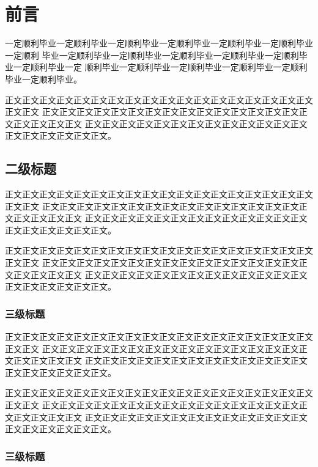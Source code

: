 \documentclass{hbutthesis}
\begin{document}
\pagestyle{fancy}
\newpage
{} %
\setcounter{page}{1} %
\chapter{前\hspace{1em}言}

\songti
一定顺利毕业一定顺利毕业一定顺利毕业一定顺利毕业一定顺利毕业一定顺利毕业一定顺利
毕业一定顺利毕业一定顺利毕业一定顺利毕业一定顺利毕业一定顺利毕业一定顺利毕业一定
顺利毕业一定顺利毕业一定顺利毕业一定顺利毕业一定顺利毕业一定顺利毕业。

正文正文正文正文正文正文正文正文正文正文正文正文正文正文正文正文正文正文正文正文
正文正文正文正文正文正文正文正文正文正文正文正文正文正文正文正文正文正文正文正文
正文正文正文正文正文正文正文正文正文正文正文正文正文正文正文正文正文正文正文。

\section{二级标题}

正文正文正文正文正文正文正文正文正文正文正文正文正文正文正文正文正文正文正文正文
正文正文正文正文正文正文正文正文正文正文正文正文正文正文正文正文正文正文正文正文
正文正文正文正文正文正文正文正文正文正文正文正文正文正文正文正文正文正文正文。

正文正文正文正文正文正文正文正文正文正文正文正文正文正文正文正文正文正文正文正文
正文正文正文正文正文正文正文正文正文正文正文正文正文正文正文正文正文正文正文正文
正文正文正文正文正文正文正文正文正文正文正文正文正文正文正文正文正文正文正文。

\subsection{三级标题}

正文正文正文正文正文正文正文正文正文正文正文正文正文正文正文正文正文正文正文正文
正文正文正文正文正文正文正文正文正文正文正文正文正文正文正文正文正文正文正文正文
正文正文正文正文正文正文正文正文正文正文正文正文正文正文正文正文正文正文正文。

正文正文正文正文正文正文正文正文正文正文正文正文正文正文正文正文正文正文正文正文
正文正文正文正文正文正文正文正文正文正文正文正文正文正文正文正文正文正文正文正文
正文正文正文正文正文正文正文正文正文正文正文正文正文正文正文正文正文正文正文。

\subsection{三级标题}
\end{document}
